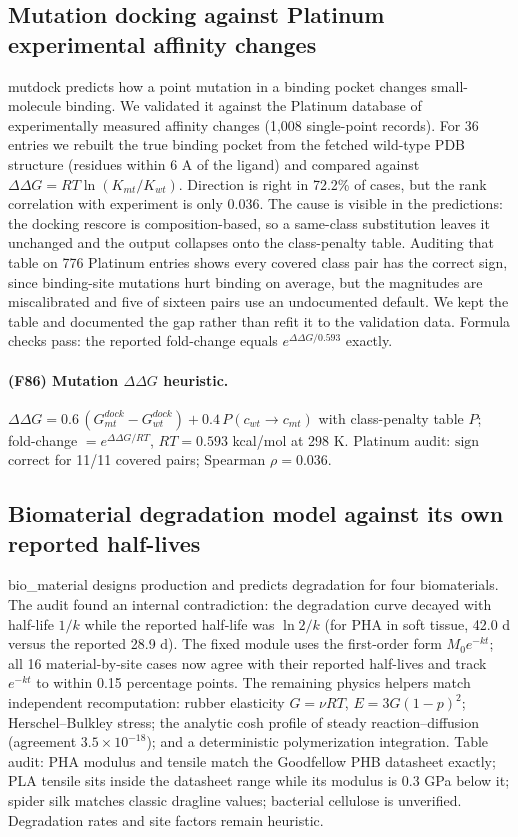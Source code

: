 \subsection{Mutation docking against Platinum experimental affinity changes}
mutdock predicts how a point mutation in a binding pocket changes small-molecule binding. We validated it against the Platinum database of experimentally measured affinity changes (1,008 single-point records). For 36 entries we rebuilt the true binding pocket from the fetched wild-type PDB structure (residues within 6 A of the ligand) and compared against $\Delta\Delta G=RT\ln(K_{mt}/K_{wt})$. Direction is right in 72.2\% of cases, but the rank correlation with experiment is only 0.036. The cause is visible in the predictions: the docking rescore is composition-based, so a same-class substitution leaves it unchanged and the output collapses onto the class-penalty table. Auditing that table on 776 Platinum entries shows every covered class pair has the correct sign, since binding-site mutations hurt binding on average, but the magnitudes are miscalibrated and five of sixteen pairs use an undocumented default. We kept the table and documented the gap rather than refit it to the validation data. Formula checks pass: the reported fold-change equals $e^{\Delta\Delta G/0.593}$ exactly.
\paragraph{(F86) Mutation $\Delta\Delta G$ heuristic.} $\Delta\Delta G=0.6\,(G_{mt}^{dock}-G_{wt}^{dock})+0.4\,P(c_{wt}\to c_{mt})$ with class-penalty table $P$; fold-change $=e^{\Delta\Delta G/RT}$, $RT=0.593$ kcal/mol at 298 K. Platinum audit: $\mathrm{sign}$ correct for 11/11 covered pairs; Spearman $\rho=0.036$.
\subsection{Biomaterial degradation model against its own reported half-lives}
bio\_material designs production and predicts degradation for four biomaterials. The audit found an internal contradiction: the degradation curve decayed with half-life $1/k$ while the reported half-life was $\ln 2/k$ (for PHA in soft tissue, 42.0 d versus the reported 28.9 d). The fixed module uses the first-order form $M_0e^{-kt}$; all 16 material-by-site cases now agree with their reported half-lives and track $e^{-kt}$ to within 0.15 percentage points. The remaining physics helpers match independent recomputation: rubber elasticity $G=\nu RT$, $E=3G(1-p)^2$; Herschel--Bulkley stress; the analytic cosh profile of steady reaction--diffusion (agreement $3.5\times10^{-18}$); and a deterministic polymerization integration. Table audit: PHA modulus and tensile match the Goodfellow PHB datasheet exactly; PLA tensile sits inside the datasheet range while its modulus is 0.3 GPa below it; spider silk matches classic dragline values; bacterial cellulose is unverified. Degradation rates and site factors remain heuristic.
